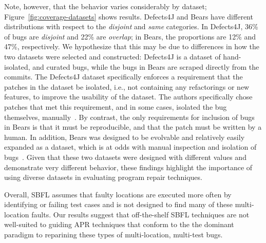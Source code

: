 Note, however, that the behavior varies considerably by dataset;
Figure~\ref{fig:coverage-datasets} shows results.  Defects4J and 
Bears have different distributions with respect to the 
\emph{disjoint} and \emph{same} categories. In Defects4J, 36\% of bugs are \emph{disjoint} and 
22\% are \emph{overlap}; in Bears, the proportions are 12\% and 47\%, respectively.
We hypothesize that this may be due to differences in how the two  
datasets were selected and constructed: Defects4J is a dataset of hand-isolated, and curated 
bugs, while the bugs in Bears are scraped directly from the
commits. The Defects4J dataset specifically enforces a requirement that the patches in the 
dataset be isolated, i.e., not containing any refactorings or new features, to improve the 
usability of the dataset. The authors specifically chose patches that met this requirement, 
and in some cases, isolated the bug themselves, manually~\cite{defects4j}. By contrast, the 
only requirements for inclusion of bugs in Bears is that it must be reproducible, and that
the patch must be written by a human. In addition, Bears was designed to be evolvable 
and relatively easily expanded as a dataset, which is at odds with manual inspection and isolation of 
bugs~\cite{bears}.
Given that these two datasets were designed with different values and demonstrate very 
different behavior, these findings highlight the importance of using diverse datasets in 
evaluating program repair techniques.

Overall, SBFL assumes that faulty locations are executed more often by identifying 
or failing test cases and is not designed to find many of these multi-location
faults. Our results suggest that off-the-shelf SBFL techniques are not
well-suited to guiding APR techniques that conform to the the dominant paradigm to reparining
these types of multi-location, multi-test bugs.


